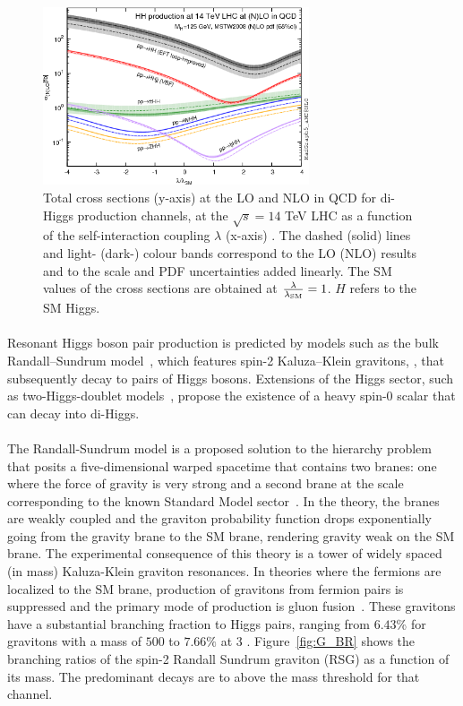 \begin{figure}[h!]
  \centering
  \captionsetup{justification=centering}
  \includegraphics[width=0.7\textwidth]{figures/theory/HH_lam}
  \caption{Total cross sections (y-axis) at the LO and NLO in QCD for di-Higgs production channels, at the $\sqrt{s} = 14$ TeV LHC as a function of the self-interaction coupling $\lambda$ (x-axis) . The dashed (solid) lines and light- (dark-) colour bands correspond to the LO (NLO) results and to the scale and PDF uncertainties added linearly. The SM values of the cross sections are obtained at $\frac{\rm \lambda}{\rm \lambda_{\rm SM}} = 1$. $H$ refers to the SM Higgs.}
  \label{fig:SM_HH_lam}
\end{figure}

\paragraph{}
Resonant Higgs boson pair production is predicted by models such as the bulk Randall--Sundrum model~\cite{Agashe:2007zd,Fitzpatrick}, which features spin-2 Kaluza--Klein gravitons, \Grav, that subsequently decay to pairs of Higgs bosons. Extensions of the Higgs sector, such as two-Higgs-doublet models~\cite{PhysRevD.8.1226, Branco:2011iw}, propose the existence of a heavy spin-0 scalar that can decay into di-Higgs. 

\paragraph{}
The Randall-Sundrum model is a proposed solution to the hierarchy problem that posits a five-dimensional warped spacetime that contains two branes: one where the force of gravity is very strong and a second brane at the \TeV scale corresponding to the known Standard Model sector~\cite{RSG1}. In the theory, the branes are weakly coupled and the graviton probability function drops exponentially going from the gravity brane to the SM brane, rendering gravity weak on the SM brane. The experimental consequence of this theory is a tower of widely spaced (in mass) Kaluza-Klein graviton resonances. In theories where the fermions are localized to the SM brane, production of gravitons from fermion pairs is suppressed and the primary mode of production is gluon fusion~\cite{RSG_LHC}. These gravitons have a substantial branching fraction to Higgs pairs, ranging from $6.43$\% for gravitons with a mass of $500$ \GeV to $7.66\%$ at $3$ \TeV. Figure~\ref{fig:G_BR} shows the branching ratios of the spin-2 Randall Sundrum graviton (RSG) as a function of its mass. The predominant decays are to \ttbar above the mass threshold for that channel. 

